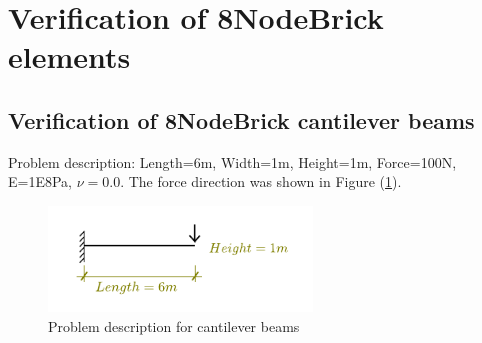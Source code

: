 \documentclass[fleqn,11pt,letter]{article}
\begin{document}

\thispagestyle{fancy}


\tableofcontents{}









\newpage

\section{Verification of 8NodeBrick elements}
\vskip 24pt

\subsection{Verification of 8NodeBrick cantilever beams}




Problem description: Length=6m, Width=1m, Height=1m, Force=100N, E=1E8Pa, $\nu=0.0$. The force direction was shown in Figure (\ref{fig Problem description for cantilever beams}). 

\begin{figure}[H]
  \centering
  \includegraphics[width=7cm]{../Figure_files/8NodeBrick/cantilever_6.pdf}
  \caption{Problem description for cantilever beams}
  \label{fig Problem description for cantilever beams}
\end{figure}
\end{document}
